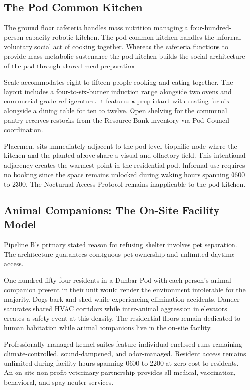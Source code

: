 \documentclass[12pt, letterpaper]{article}
\begin{document}
\subsection{The Pod Common Kitchen}

The ground floor cafeteria handles mass nutrition managing a four-hundred-person capacity robotic kitchen. The pod common kitchen handles the informal voluntary social act of cooking together. Whereas the cafeteria functions to provide mass metabolic sustenance the pod kitchen builds the social architecture of the pod through shared meal preparation.

Scale accommodates eight to fifteen people cooking and eating together. The layout includes a four-to-six-burner induction range alongside two ovens and commercial-grade refrigerators. It features a prep island with seating for six alongside a dining table for ten to twelve. Open shelving for the communal pantry receives restocks from the Resource Bank inventory via Pod Council coordination.

Placement sits immediately adjacent to the pod-level biophilic node where the kitchen and the planted alcove share a visual and olfactory field. This intentional adjacency creates the warmest point in the residential pod. Informal use requires no booking since the space remains unlocked during waking hours spanning 0600 to 2300. The Nocturnal Access Protocol remains inapplicable to the pod kitchen.

\subsection{Animal Companions: The On-Site Facility Model}

Pipeline B's primary stated reason for refusing shelter involves pet separation. The architecture guarantees contiguous pet ownership and unlimited daytime access.

One hundred fifty-four residents in a Dunbar Pod with each person's animal companion present in their unit would render the environment intolerable for the majority. Dogs bark and shed while experiencing elimination accidents. Dander saturates shared HVAC corridors while inter-animal aggression in elevators creates a safety event at this density. The residential floors remain dedicated to human habitation while animal companions live in the on-site facility.

Professionally managed kennel suites feature individual enclosed runs remaining climate-controlled, sound-dampened, and odor-managed. Resident access remains unlimited during facility hours spanning 0600 to 2200 at zero cost to residents. An on-site non-profit veterinary partnership provides all medical, vaccination, behavioral, and spay-neuter services.
\end{document}
